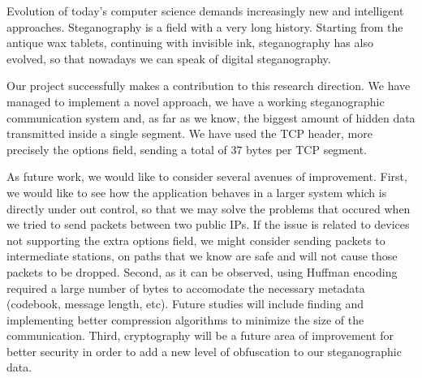 
Evolution of today's computer science demands increasingly new and intelligent
approaches. Steganography is a field with a very long history. Starting from
the antique wax tablets, continuing with invisible ink, steganography has also
evolved, so that nowadays we can speak of digital steganography.

Our project successfully makes a contribution to this research direction. We have managed to
implement a novel approach, we have a working steganographic communication system and,
as far as we know, the biggest amount of hidden data transmitted inside a
single segment. We have used the TCP header, more precisely the options
field, sending a total of 37 bytes per TCP segment.

As future work, we would like to consider several avenues of improvement. First, we would like to
see how the application behaves in a larger system which is directly under out
control, so that we may solve
the problems that occured when we tried to send packets between two public IPs. If
the issue is related to devices not supporting the extra options field, we might
consider sending packets to intermediate stations, on paths that we know are safe
and will not cause those packets to be dropped. Second, as it can be observed, using
Huffman encoding required a large number of bytes to accomodate the necessary metadata
(codebook, message length, etc). Future studies will include finding and
implementing better compression algorithms to minimize the size of the
communication. Third, cryptography will be a future area of improvement for
better security in order to add a new level of obfuscation to our steganographic data.
